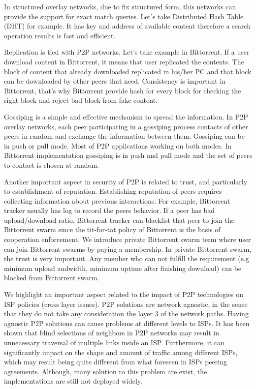 In structured overlay networks, due to fix structured form, this networks can provide the support for exact match queries.  
Let's take Distributed Hash Table (DHT) for example. 
It has key and address of available content therefore a search operation results is fast and efficient.

Replication is tied with P2P networks.  
Let's take example in Bittorrent.  
If a user download content in Bittorrent,  it means that user replicated the contents.  
The block of content that already downloaded replicated in his/her PC and that block can be downloaded by other peers that need.
Consistency is important in Bittorrent, that's why Bittorrent provide hash for every block for checking the right block and reject bad block from fake content.

Gossiping is a simple and effective mechanism to spread the information. 
In P2P overlay networks, each peer participating in a gossiping process contacts of other peers in random and exchange the information between them.
Gossiping can be in push or pull mode.
Most of P2P applications working on both modes.
In Bittorrent implementation gossiping is in push and pull mode and the set of peers to contact is chosen at random.

Another important aspect in security of P2P is related to trust, and particularly to establishment of reputation. 
Establishing reputation of peers requires collecting information about previous interactions. 
For example, Bittorrent tracker usually has log to record the peers behavior. 
If a peer has bad upload/download ratio, Bittorrent tracker can blacklist that peer to join the Bittorrent swarm since the tit-for-tat policy of Bittorrent is the basis of cooperation enforcement.
We introduce private Bittorrent swarm term where user can join Bittorrent swarms by paying a membership.  
In private Bittorrent swarm, the trust is very important. 
Any member who can not fulfill the requirement (e.g minimum upload andwidth, minimum uptime after finishing download) can be blocked from Bittorrent swarm.

We highlight an important aspect related to the impact of P2P technologies on ISP policies (cross layer issues). 
P2P solutions are network agnostic, in the sense that they do not take any consideration the layer 3 of the network paths. 
Having agnostic P2P solutions can cause problems at different levels to ISPs. 
It has been shown that blind selections of neighbors in P2P networks may result in unnecessary traversal of multiple links inside an ISP. 
Furthermore, it can significantly impact on the shape and amount of traffic among different ISPs, which may result being quite different from what foreseen in ISPs peering agreements.
Although, many solution to this problem are exist, the implementations are still not deployed widely.  

